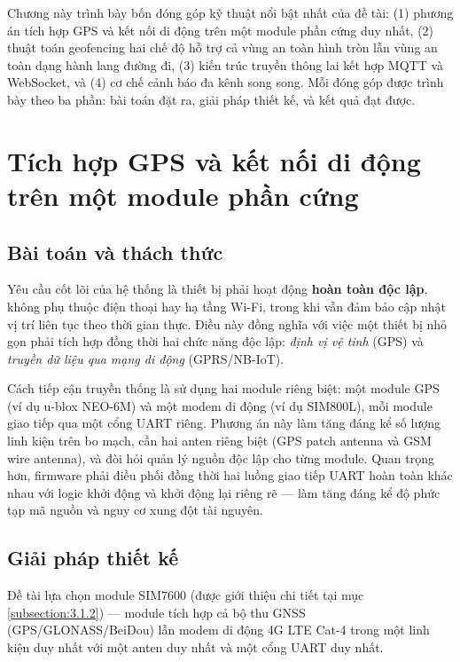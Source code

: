 \documentclass[../DoAn.tex]{subfiles}
\begin{document}
Chương này trình bày bốn đóng góp kỹ thuật nổi bật nhất của đề tài: (1) phương án tích hợp GPS và kết nối di động trên một module phần cứng duy nhất, (2) thuật toán geofencing hai chế độ hỗ trợ cả vùng an toàn hình tròn lẫn vùng an toàn dạng hành lang đường đi, (3) kiến trúc truyền thông lai kết hợp MQTT và WebSocket, và (4) cơ chế cảnh báo đa kênh song song. Mỗi đóng góp được trình bày theo ba phần: bài toán đặt ra, giải pháp thiết kế, và kết quả đạt được.

\section{Tích hợp GPS và kết nối di động trên một module phần cứng}
\label{section:5.1}

\subsection{Bài toán và thách thức}

Yêu cầu cốt lõi của hệ thống là thiết bị phải hoạt động \textbf{hoàn toàn độc lập}, không phụ thuộc điện thoại hay hạ tầng Wi-Fi, trong khi vẫn đảm bảo cập nhật vị trí liên tục theo thời gian thực. Điều này đồng nghĩa với việc một thiết bị nhỏ gọn phải tích hợp đồng thời hai chức năng độc lập: \textit{định vị vệ tinh} (GPS) và \textit{truyền dữ liệu qua mạng di động} (GPRS/NB-IoT).

Cách tiếp cận truyền thống là sử dụng hai module riêng biệt: một module GPS (ví dụ u-blox NEO-6M) và một modem di động (ví dụ SIM800L), mỗi module giao tiếp qua một cổng UART riêng. Phương án này làm tăng đáng kể số lượng linh kiện trên bo mạch, cần hai anten riêng biệt (GPS patch antenna và GSM wire antenna), và đòi hỏi quản lý nguồn độc lập cho từng module. Quan trọng hơn, firmware phải điều phối đồng thời hai luồng giao tiếp UART hoàn toàn khác nhau với logic khởi động và khởi động lại riêng rẽ — làm tăng đáng kể độ phức tạp mã nguồn và nguy cơ xung đột tài nguyên.

\subsection{Giải pháp thiết kế}

Đề tài lựa chọn module SIM7600 (được giới thiệu chi tiết tại mục \ref{subsection:3.1.2}) — module tích hợp cả bộ thu GNSS (GPS/GLONASS/BeiDou) lẫn modem di động 4G LTE Cat-4 trong một linh kiện duy nhất với một anten duy nhất và một cổng UART duy nhất.
\end{document}
